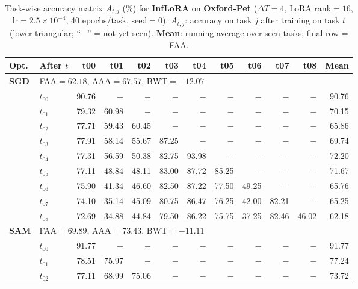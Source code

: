 \begin{table}[ht]
\centering
\caption{%
  Task-wise accuracy matrix $A_{t,j}$ (\%) for \textbf{InfLoRA} on \textbf{Oxford-Pet} ($\Delta T=4$, LoRA rank$=16$, lr$=2.5\times10^{-4}$, 40 epochs/task, seed$=0$).
  $A_{t,j}$: accuracy on task $j$ after training on task $t$  (lower-triangular; ``$-$'' = not yet seen).
  \textbf{Mean}: running average over seen tasks; final row = FAA.
}
\label{tab:raw_inflora_pets}
\setlength{\tabcolsep}{2.8pt}
\renewcommand{\arraystretch}{0.88}
\scriptsize
\begin{tabular}{@{}l l r r r r r r r r r r@{}}
\toprule
\textbf{Opt.} & \textbf{After $t$} & \textbf{t00} & \textbf{t01} & \textbf{t02} & \textbf{t03} & \textbf{t04} & \textbf{t05} & \textbf{t06} & \textbf{t07} & \textbf{t08} & \textbf{Mean} \\
\midrule
\multirow{10}{*}{\textbf{SGD}} & \multicolumn{11}{l}{\quad\small FAA$=62.18$,\; AAA$=67.57$,\; BWT$=-12.07$} \\
 & $t_{00}$ & 90.76 & $-$ & $-$ & $-$ & $-$ & $-$ & $-$ & $-$ & $-$ & 90.76 \\
 & $t_{01}$ & 79.32 & 60.98 & $-$ & $-$ & $-$ & $-$ & $-$ & $-$ & $-$ & 70.15 \\
 & $t_{02}$ & 77.71 & 59.43 & 60.45 & $-$ & $-$ & $-$ & $-$ & $-$ & $-$ & 65.86 \\
 & $t_{03}$ & 77.91 & 58.14 & 55.67 & 87.25 & $-$ & $-$ & $-$ & $-$ & $-$ & 69.74 \\
 & $t_{04}$ & 77.31 & 56.59 & 50.38 & 82.75 & 93.98 & $-$ & $-$ & $-$ & $-$ & 72.20 \\
 & $t_{05}$ & 77.11 & 48.84 & 48.11 & 83.00 & 87.72 & 85.25 & $-$ & $-$ & $-$ & 71.67 \\
 & $t_{06}$ & 75.90 & 41.34 & 46.60 & 82.50 & 87.22 & 77.50 & 49.25 & $-$ & $-$ & 65.76 \\
 & $t_{07}$ & 74.10 & 35.14 & 45.09 & 80.75 & 86.47 & 76.25 & 42.00 & 82.21 & $-$ & 65.25 \\
 & $t_{08}$ & 72.69 & 34.88 & 44.84 & 79.50 & 86.22 & 75.75 & 37.25 & 82.46 & 46.02 & 62.18 \\
\midrule
\multirow{10}{*}{\textbf{SAM}} & \multicolumn{11}{l}{\quad\small FAA$=69.89$,\; AAA$=73.43$,\; BWT$=-11.11$} \\
 & $t_{00}$ & 91.77 & $-$ & $-$ & $-$ & $-$ & $-$ & $-$ & $-$ & $-$ & 91.77 \\
 & $t_{01}$ & 78.51 & 75.97 & $-$ & $-$ & $-$ & $-$ & $-$ & $-$ & $-$ & 77.24 \\
 & $t_{02}$ & 77.11 & 68.99 & 75.06 & $-$ & $-$ & $-$ & $-$ & $-$ & $-$ & 73.72 \\

\end{tabular}
\end{table}
